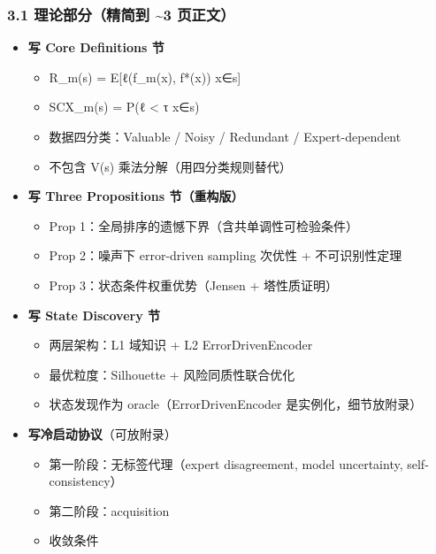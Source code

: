\documentclass[
  12pt,
]{ctexart}
\providecommand{\tightlist}{%
  \setlength{\itemsep}{0pt}\setlength{\parskip}{0pt}}
\begin{document}
\subsubsection{3.1 理论部分（精简到 \textasciitilde3
页正文）}\label{ux7406ux8bbaux90e8ux5206ux7cbeux7b80ux5230-3-ux9875ux6b63ux6587}

\begin{itemize}
\tightlist
\item[$\square$]
  \textbf{写 Core Definitions 节}

  \begin{itemize}
  \tightlist
  \item
    R\_m(s) = E{[}ℓ(f\_m(x), f*(x)) \textbar{} x∈s{]}
  \item
    SCX\_m(s) = P(ℓ \textless{} τ \textbar{} x∈s)
  \item
    数据四分类：Valuable / Noisy / Redundant / Expert-dependent
  \item
    不包含 V(s) 乘法分解（用四分类规则替代）
  \end{itemize}
\item[$\square$]
  \textbf{写 Three Propositions 节（重构版）}

  \begin{itemize}
  \tightlist
  \item
    Prop 1：全局排序的遗憾下界（含共单调性可检验条件）
  \item
    Prop 2：噪声下 error-driven sampling 次优性 + 不可识别性定理
  \item
    Prop 3：状态条件权重优势（Jensen + 塔性质证明）
  \end{itemize}
\item[$\square$]
  \textbf{写 State Discovery 节}

  \begin{itemize}
  \tightlist
  \item
    两层架构：L1 域知识 + L2 ErrorDrivenEncoder
  \item
    最优粒度：Silhouette + 风险同质性联合优化
  \item
    状态发现作为 oracle（ErrorDrivenEncoder 是实例化，细节放附录）
  \end{itemize}
\item[$\square$]
  \textbf{写冷启动协议}（可放附录）

  \begin{itemize}
  \tightlist
  \item
    第一阶段：无标签代理（expert disagreement, model uncertainty,
    self-consistency）
  \item
    第二阶段：acquisition
  \item
    收敛条件
  \end{itemize}
\end{itemize}
\end{document}
